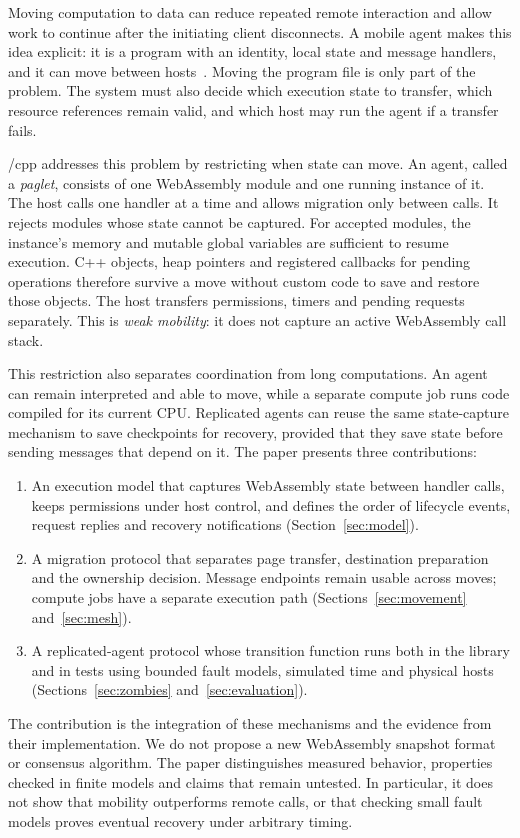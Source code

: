 
Moving computation to data can reduce repeated remote interaction and
allow work to continue after the initiating client disconnects. A mobile
agent makes this idea explicit: it is a program with an identity, local
state and message handlers, and it can move between
hosts~\cite{lange1997aglets,karnik1998design}. Moving the program file is
only part of the problem. The system must also decide which execution
state to transfer, which resource references remain valid, and which
host may run the agent if a transfer fails.

\paglets{}/cpp addresses this problem by restricting when state can move.
An agent, called a \emph{paglet}, consists of one WebAssembly module and
one running instance of it. The host calls one handler at a time and
allows migration only between calls. It rejects modules whose state
cannot be captured. For accepted modules, the instance's memory and
mutable global variables are sufficient to resume execution. C++ objects,
heap pointers and registered callbacks for pending operations therefore
survive a move without custom code to save and restore those objects.
The host transfers permissions, timers and pending requests separately.
This is \emph{weak mobility}: it does not capture an active WebAssembly
call stack.

This restriction also separates coordination from long computations.
An agent can remain interpreted and able to move, while a separate
compute job runs code compiled for its current CPU. Replicated agents
can reuse the same state-capture mechanism to save checkpoints for
recovery, provided that they save state before sending messages that
depend on it. The paper presents three contributions:

\begin{enumerate}[leftmargin=2em]
\item An execution model that captures WebAssembly state between handler
  calls, keeps permissions under host control, and defines the order of
  lifecycle events, request replies and recovery notifications
  (Section~\ref{sec:model}).
\item A migration protocol that separates page transfer, destination
  preparation and the ownership decision. Message endpoints remain
  usable across moves; compute jobs have a separate execution path
  (Sections~\ref{sec:movement} and~\ref{sec:mesh}).
\item A replicated-agent protocol whose transition function runs both in
  the library and in tests using bounded fault models, simulated time
  and physical hosts (Sections~\ref{sec:zombies}
  and~\ref{sec:evaluation}).
\end{enumerate}

The contribution is the integration of these mechanisms and the evidence
from their implementation. We do not propose a new WebAssembly snapshot
format or consensus algorithm. The paper distinguishes measured behavior,
properties checked in finite models and claims that remain untested.
In particular, it does not show that mobility outperforms remote calls,
or that checking small fault models proves eventual recovery under
arbitrary timing.
